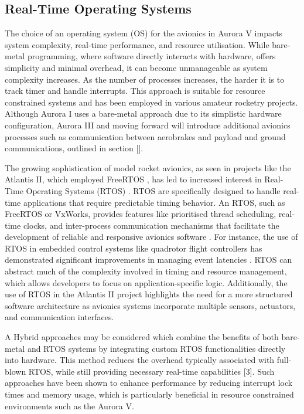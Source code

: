 \subsection{Real-Time Operating Systems}
The choice of an operating system (OS) for the avionics in Aurora V impacts system complexity, real-time performance, and resource utilisation. While bare-metal programming, where software directly interacts with hardware, offers simplicity and minimal overhead, it can become unmanageable as system complexity increases. As the number of processes increases, the harder it is to track timer and handle interrupts. This approach is suitable for resource constrained systems and has been employed in various amateur rocketry projects. Although Aurora I uses a bare-metal approach due to its simplistic hardware configuration, Aurora III and moving forward will introduce additional avionics processes such as communication between aerobrakes and payload and ground communications, outlined in section [].  

The growing sophistication of model rocket avionics, as seen in projects like the Atlantis II, which employed FreeRTOS \cite{Atlantis2018}, has led to increased interest in Real-Time Operating Systems (RTOS) \cite{Di2018}. RTOS are specifically designed to handle real-time applications that require predictable timing behavior. An RTOS, such as FreeRTOS or VxWorks, provides features like prioritised thread scheduling, real-time clocks, and inter-process communication mechanisms that facilitate the development of reliable and responsive avionics software \cite{Dietrich2017}. For instance, the use of RTOS in embedded control systems like quadrotor flight controllers has demonstrated significant improvements in managing event latencies \cite{Di2018}. RTOS can abstract much of the complexity involved in timing and resource management, which allows developers to focus on application-specific logic. Additionally, the use of RTOS in the Atlantis II project highlights the need for a more structured software architecture as avionics systems incorporate multiple sensors, actuators, and communication interfaces.  

A Hybrid approaches may be considered which combine the benefits of both bare-metal and RTOS systems by integrating custom RTOS functionalities directly into hardware. This method reduces the overhead typically associated with full-blown RTOS, while still providing necessary real-time capabilities [3]. Such approaches have been shown to enhance performance by reducing interrupt lock times and memory usage, which is particularly beneficial in resource constrained environments such as the Aurora V.  


